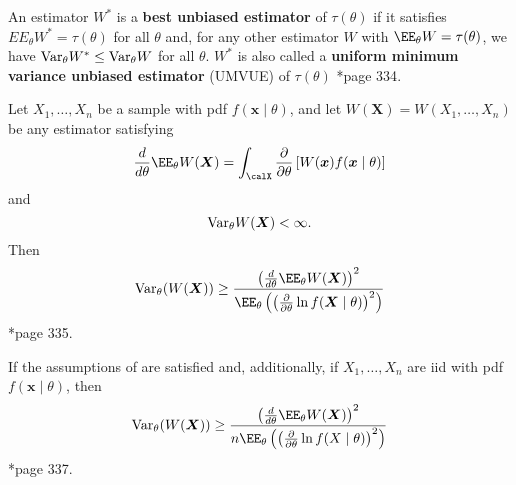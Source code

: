 \begin{defe} \label{defe: umvu}
    An estimator $W^{\ast}$ is a {\bf best unbiased estimator} of $\tau (\theta)$ if it satisfies $EE_{\theta} W^{\ast} = \tau (\theta)$ for all $\theta$ and, for any other estimator $W$ with $\EE_{\theta} W = \tau (\theta)$, we have ${\operatorname{Var}}_{\theta} W^{\ast} \leq {\operatorname{Var}}_{\theta} W$ for all $\theta$. $W^{\ast}$ is also called a {\bf uniform minimum variance unbiased estimator} (UMVUE) of $\tau (\theta)$ \cite{CasellaGeorge2001SI}*{page 334}.
\end{defe}

\begin{thm} \label{thm: cri_neq}
    Let $X_1 , \ldots , X_n$ be a sample with pdf $f(\bm{x} \mid \theta)$, and let $W(\bm{X}) = W(X_1 , \ldots , X_n)$ be any estimator satisfying
    \begin{equation*}
        \frac{d}{d \theta} \EE_{\theta} W(\bm{X}) = \int_{\calX} \frac{\partial}{\partial \theta} \left[ W(\bm{x}) f(\bm{x} \mid \theta) \right]
    \end{equation*}
    and
    \begin{equation*}
        {\operatorname{Var}}_{\theta} W(\bm{X}) < \infty.
    \end{equation*}
    Then
    \begin{equation*}
        \Var_{\theta} (W(\bm{X})) \geq \frac{\left( \frac{d}{d \theta} \EE_{\theta} W(\bm{X}) \right)^2}{\EE_{\theta} \left( \left( \frac{\partial}{\partial \theta} \ln f(\bm{X} \mid \theta)  \right)^2 \right)}
    \end{equation*}
    \cite{CasellaGeorge2001SI}*{page 335}.
\end{thm}

\begin{cor} \label{cor: cri_neq_iid}
    If the assumptions of  are satisfied and, additionally, if $X_1 , \ldots , X_n$ are iid with pdf $f(\bm{x} \mid \theta)$, then
    \begin{equation*}
        \Var_{\theta} (W(\bm{X})) \geq \frac{\left( \frac{d}{d \theta} \EE_{\theta} W(\bm{X}) \right)^2}{n \EE_{\theta} \left( \left( \frac{\partial}{\partial \theta} \ln f(X \mid \theta)  \right)^2 \right)}
    \end{equation*}
    \cite{CasellaGeorge2001SI}*{page 337}.
\end{cor}

